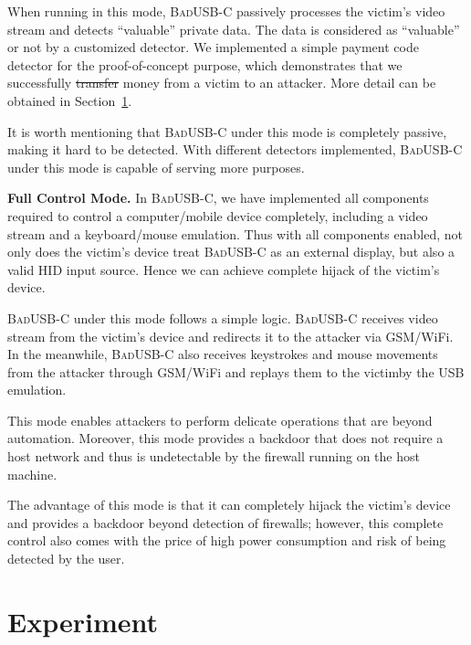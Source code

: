 \documentclass[conference]{IEEEtran}
\newcommand{\tool}{\mbox{\textsc{BadUSB-C}}\xspace}
\newcommand{\hongyi}[1]{}
\newcommand{\shuqing}[1]{}
\providecommand{\DIFaddtex}[1]{{\protect\color{blue}\uwave{#1}}} %
\providecommand{\DIFdeltex}[1]{{\protect\color{red}\sout{#1}}}                      %
\providecommand{\DIFaddbegin}{} %
\providecommand{\DIFaddend}{} %
\providecommand{\DIFdelbegin}{} %
\providecommand{\DIFdelend}{} %
\providecommand{\DIFadd}[1]{\texorpdfstring{\DIFaddtex{#1}}{#1}} %
\providecommand{\DIFdel}[1]{\texorpdfstring{\DIFdeltex{#1}}{}} %
\newcommand{\DIFscaledelfig}{0.5}
\newlength{\DIFdelgraphicswidth} %
\newlength{\DIFdelgraphicsheight} %
\newcommand{\DIFaddincludegraphics}[2][]{{\color{blue}\fbox{\DIFOincludegraphics[#1]{#2}}}} %
\newcommand{\DIFdelincludegraphics}[2][]{%
\sbox{\DIFdelgraphicsbox}{\DIFOincludegraphics[#1]{#2}}%
\settoboxwidth{\DIFdelgraphicswidth}{\DIFdelgraphicsbox} %
\settoboxtotalheight{\DIFdelgraphicsheight}{\DIFdelgraphicsbox} %
\scalebox{\DIFscaledelfig}{%
\parbox[b]{\DIFdelgraphicswidth}{\usebox{\DIFdelgraphicsbox}\\[-\baselineskip] \rule{\DIFdelgraphicswidth}{0em}}\llap{\resizebox{\DIFdelgraphicswidth}{\DIFdelgraphicsheight}{%
\setlength{\unitlength}{\DIFdelgraphicswidth}%
\begin{picture}(1,1)%
\thicklines\linethickness{2pt} %
{\color[rgb]{1,0,0}\put(0,0){\framebox(1,1){}}}%
{\color[rgb]{1,0,0}\put(0,0){\line( 1,1){1}}}%
{\color[rgb]{1,0,0}\put(0,1){\line(1,-1){1}}}%
\end{picture}%
}\hspace*{3pt}}} %
} %
\DeclareRobustCommand{\DIFaddbegin}{\DIFOaddbegin \let\includegraphics\DIFaddincludegraphics} %
\DeclareRobustCommand{\DIFaddend}{\DIFOaddend \let\includegraphics\DIFOincludegraphics} %
\DeclareRobustCommand{\DIFdelbegin}{\DIFOdelbegin \let\includegraphics\DIFdelincludegraphics} %
\DeclareRobustCommand{\DIFdelend}{\DIFOaddend \let\includegraphics\DIFOincludegraphics} %
\begin{document}
When running in this mode, \tool passively processes the victim's video stream
and detects ``valuable'' private data.  The data is considered as
``valuable'' or not by a customized detector. We implemented a simple
payment code detector for the proof-of-concept purpose, which demonstrates that we successfully \DIFdelbegin \DIFdel{transfer }\DIFdelend \DIFaddbegin \DIFadd{transfered }\DIFaddend money from a victim to an
attacker. More detail can be obtained in Section~\ref{sec:experiment}.

It is worth mentioning that \tool under this mode is completely passive, making
it hard to be detected. With different detectors implemented, \tool
under this mode is capable of serving more purposes.

\textbf{Full Control Mode.} In \tool, we have implemented all components
required to control a computer/mobile device completely, including a video stream
and a keyboard/mouse emulation. Thus with all components enabled, not only does
the victim's device treat \tool as an external display, but also a valid \ac{HID}
input source. Hence we can achieve complete hijack of the victim's device.

\tool under this mode follows a simple logic. \tool receives video stream
from the victim's device and redirects it to the attacker via GSM/WiFi. In the
meanwhile, \tool also receives keystrokes and mouse movements from the attacker
through GSM/WiFi and replays them to the victim\DIFaddbegin \DIFadd{'s device }\DIFaddend by the \ac{USB} emulation.

This mode enables attackers to perform delicate operations that are beyond
automation. Moreover, this mode provides a backdoor that does not require a host
network and thus is undetectable by the firewall running on the host machine.

The advantage of this mode is that it can completely hijack the victim's device
and provides a backdoor beyond detection of firewalls; however, this complete control
also comes with the price of high power consumption and risk of being detected
by the user.


\section{Experiment}
\label{sec:experiment}
\end{document}
